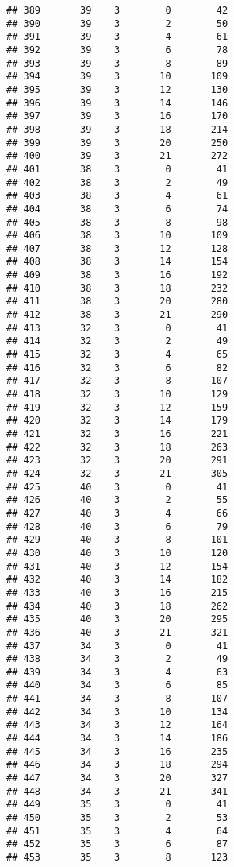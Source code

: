\documentclass[
]{article}
\begin{document}
\begin{verbatim}
## 389       39    3        0        42
## 390       39    3        2        50
## 391       39    3        4        61
## 392       39    3        6        78
## 393       39    3        8        89
## 394       39    3       10       109
## 395       39    3       12       130
## 396       39    3       14       146
## 397       39    3       16       170
## 398       39    3       18       214
## 399       39    3       20       250
## 400       39    3       21       272
## 401       38    3        0        41
## 402       38    3        2        49
## 403       38    3        4        61
## 404       38    3        6        74
## 405       38    3        8        98
## 406       38    3       10       109
## 407       38    3       12       128
## 408       38    3       14       154
## 409       38    3       16       192
## 410       38    3       18       232
## 411       38    3       20       280
## 412       38    3       21       290
## 413       32    3        0        41
## 414       32    3        2        49
## 415       32    3        4        65
## 416       32    3        6        82
## 417       32    3        8       107
## 418       32    3       10       129
## 419       32    3       12       159
## 420       32    3       14       179
## 421       32    3       16       221
## 422       32    3       18       263
## 423       32    3       20       291
## 424       32    3       21       305
## 425       40    3        0        41
## 426       40    3        2        55
## 427       40    3        4        66
## 428       40    3        6        79
## 429       40    3        8       101
## 430       40    3       10       120
## 431       40    3       12       154
## 432       40    3       14       182
## 433       40    3       16       215
## 434       40    3       18       262
## 435       40    3       20       295
## 436       40    3       21       321
## 437       34    3        0        41
## 438       34    3        2        49
## 439       34    3        4        63
## 440       34    3        6        85
## 441       34    3        8       107
## 442       34    3       10       134
## 443       34    3       12       164
## 444       34    3       14       186
## 445       34    3       16       235
## 446       34    3       18       294
## 447       34    3       20       327
## 448       34    3       21       341
## 449       35    3        0        41
## 450       35    3        2        53
## 451       35    3        4        64
## 452       35    3        6        87
## 453       35    3        8       123

\end{verbatim}
\end{document}
